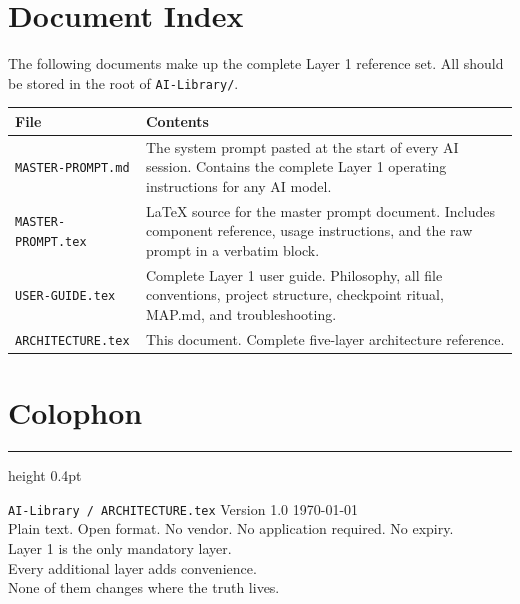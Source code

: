 \documentclass[12pt,letterpaper]{article}
\begin{document}
\section{Document Index}

The following documents make up the complete Layer 1 reference set.
All should be stored in the root of \texttt{AI-Library/}.

\begin{center}
\begin{tabular}{@{}lp{9cm}@{}}
\toprule
\textbf{File} & \textbf{Contents} \\
\midrule
\texttt{MASTER-PROMPT.md} &
The system prompt pasted at the start of every AI session.
Contains the complete Layer 1 operating instructions for any AI model. \\
\texttt{MASTER-PROMPT.tex} &
LaTeX source for the master prompt document. Includes component
reference, usage instructions, and the raw prompt in a verbatim block. \\
\texttt{USER-GUIDE.tex} &
Complete Layer 1 user guide. Philosophy, all file conventions,
project structure, checkpoint ritual, MAP.md, and troubleshooting. \\
\texttt{ARCHITECTURE.tex} &
This document. Complete five-layer architecture reference. \\
\bottomrule
\end{tabular}
\end{center}

\section*{Colophon}

\vspace{8pt}
\hrule height 0.4pt
\vspace{12pt}

\begin{center}
{\small\texttt{AI-Library / ARCHITECTURE.tex} \quad Version 1.0 \quad \today}\\[6pt]
{\small Plain text. Open format. No vendor. No application required. No expiry.}\\[4pt]
{\footnotesize
Layer 1 is the only mandatory layer.\\
Every additional layer adds convenience.\\
None of them changes where the truth lives.
}
\end{center}
\end{document}
